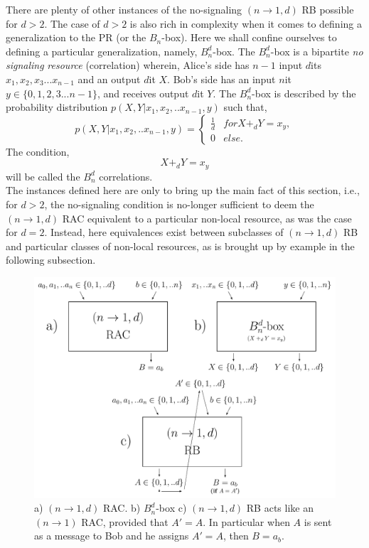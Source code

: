 \documentclass[%
 reprint,
 amsmath,amssymb,
 aps,
]{revtex4-1}
\begin{document}
There are plenty of other instances of the no-signaling $(n \rightarrow 1,d)$ RB possible for $d>2$. The case of $d>2$ is also rich in complexity when it comes to defining a generalization to the PR (or the $B_n$-box). Here we shall confine ourselves to defining a particular generalization, namely, $B_n^d$-box. The $B_n^d$-box is a bipartite \textit{no signaling} \textit{resource} (correlation) wherein, Alice's side has $n-1$ input $d$its $x_{1},x_{2},x_{3}...x_{n-1}$ and an output $d$it $X$. Bob's side has an input $n$it $y\in\{0,1,2,3...n-1\}$, and receives output $d$it $Y$. 
The $B_n^d$-box is described by the probability distribution $p(X,Y|x_1,x_2,..x_{n-1},y)$ such that, \\ 
\begin{equation}
p(X,Y|x_1,x_2,..x_{n-1},y)=
\begin{cases}
\frac{1}{d} & for X+_d Y=x_y,\\
0 & else.
\end{cases}
\end{equation}
The condition,
\begin{equation} \label{Bndcorr}
X+_d Y=x_y
\end{equation}
will be called the $B_n^d$ correlations.\\ 
The instances defined here are only to bring up the main fact of this section, i.e., for $d>2$, the no-signaling condition is no-longer sufficient to deem the  $(n \rightarrow 1,d)$ RAC  equivalent to a particular non-local resource, as was the case for $d=2$. Instead, here equivalences exist between subclasses of $(n \rightarrow 1,d)$ RB and particular classes of non-local resources, as is brought up by example in the following subsection. \\
\begin{figure}
\includegraphics[scale=0.5]{Def2.pdf}
\caption{  \label{Def2} a) $(n\rightarrow 1,d)$ RAC. b) $B_n^d$-box c) $(n\rightarrow 1,d)$ RB acts like an $(n\rightarrow 1)$ RAC, provided that $A'=A$. In particular when $A$ is sent as a message to Bob and he assigns $A'=A$, then $B=a_b$. }
\end{figure}
\end{document}
